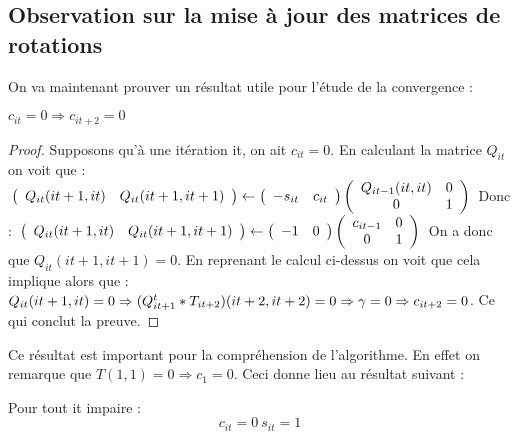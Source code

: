 \documentclass[12 pt]{article}
\begin{document}
\subsection*{Observation sur la mise à jour des matrices de rotations}

On va maintenant prouver un résultat utile pour l'étude de la convergence :

\begin{theorem}
$c_{it} = 0 \Rightarrow c_{it+2} = 0$
\end{theorem}

\begin{proof}
Supposons qu'à une itération it, on ait $c_{it}=0$. En calculant la matrice $Q_{it}$ on voit que : 
   $ \\
\left (\begin{array}{cc} Q_{it}(it+1, it) & Q_{it}(it+1,it+1) \end{array}\right )
\leftarrow
\left (\begin{array}{cc} -s_{it} & c_{it} \end{array} \right )
\left (\begin{array}{cc} Q_{it-1}(it,it) & 0 \\ 0 & 1\end{array} \right ) \\ $ 
Donc : $ \\
\left (\begin{array}{cc} Q_{it}(it+1, it) & Q_{it}(it+1,it+1) \end{array}\right )
\leftarrow
\left (\begin{array}{cc} -1 & 0 \end{array} \right )
\left (\begin{array}{cc} c_{it-1} & 0 \\ 0 & 1\end{array} \right ) \\$ 
On a donc que $Q_{it}(it+1,it+1) = 0$.
En reprenant le calcul ci-dessus on voit que cela implique alors que : $ \\ Q_{it}(it+1, it) = 0 \Rightarrow (Q^t_{it+1}*T_{it+2}) (it+2,it+2) =0 \Rightarrow \gamma =0 \Rightarrow c_{it+2} =0 $.
Ce qui conclut la preuve.


\end{proof}
 
Ce résultat est important pour la compréhension de l'algorithme. En effet on remarque que $T(1,1) =0 \Rightarrow c_1 =0$. Ceci donne lieu au résultat suivant : 

\begin{theorem}
Pour tout it impaire : 
  \[c_{it}= 0  \ s_{it}=1\]
\end{theorem}
\end{document}
